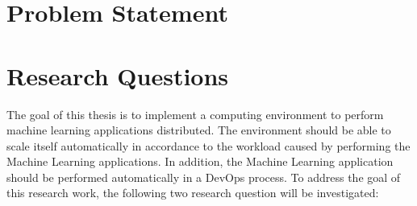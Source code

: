 


\section{Problem Statement}











\section{Research Questions}
The goal of this thesis is to implement a computing environment to perform machine learning applications distributed. The environment should be able to scale itself automatically in accordance to the workload caused by performing the Machine Learning applications. In addition, the Machine Learning application should be performed automatically in a DevOps process. To address the goal of this research work, the following two research question will be investigated:


